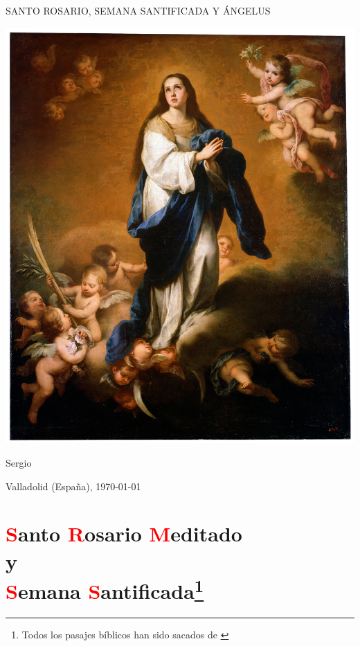\documentclass[10pt,twoside]{book}
\begin{document}
\begin{titlepage}
      \begin{center}

            \vspace*{10em}

            {\Huge \uppercase{Santo Rosario, Semana Santificada y Ángelus}}

            \vspace{1.5em}

            {\includegraphics[scale=0.95]{foto-04.jpg}}

            \vspace{0.5em}

            Sergio

            Valladolid (España), \monthyeardate\today
      \end{center}
\end{titlepage}

\chapter*{\centering\textcolor{red}{S}anto \textcolor{red}{R}osario \textcolor{red}{M}editado \\ y \\ \textcolor{red}{S}emana \textcolor{red}{S}antificada\footnote{Todos los pasajes
bíblicos han sido sacados de \cite{bover-cantera}}}
\end{document}
